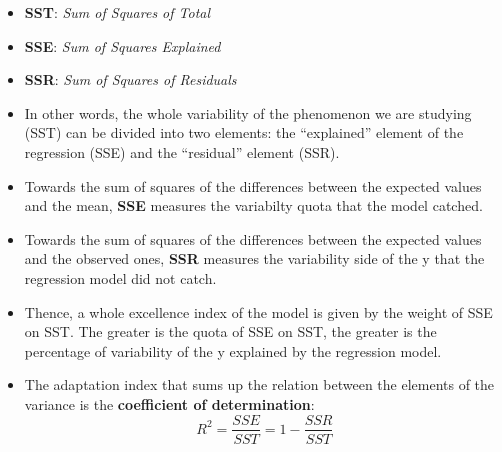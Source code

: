 \begin{frame}
  \vspace*{.25cm}
  \begin{itemize}
    \item \textbf{SST}: \textit{Sum of Squares of Total} 
    \item \textbf{SSE}: \textit{Sum of Squares Explained} 
    \item \textbf{SSR}: \textit{Sum of Squares of Residuals} 
    \vspace*{.5cm}
    \item In other words, the whole variability of the phenomenon we are studying (SST) can be divided into two elements: the ``explained'' element of the regression (SSE) and the ``residual'' element (SSR).
    \vspace*{.5cm}
    \item Towards the sum of squares of the differences between the expected values and the mean, \textbf{SSE} measures the variabilty quota that the model catched. 
    \item Towards the sum of squares of the differences between the expected values and the observed ones, \textbf{SSR} measures the variability side of the y that the regression model did not catch.
  \end{itemize}
\end{frame}


\begin{frame}
  \vspace*{.5cm}
  \begin{itemize}
    \item Thence, a whole excellence index of the model is given by the weight of SSE on SST. The greater is the quota of SSE on SST, the greater is the percentage of variability of the y explained by the regression model.
    \vspace*{.75cm}
    \item The adaptation index that sums up the relation between the elements of the variance is the \textbf{coefficient of determination}:
      \vspace*{.4cm} $$ R^2 = \frac{SSE}{SST} = 1 - \frac{SSR}{SST} $$
  \end{itemize}
\end{frame}

